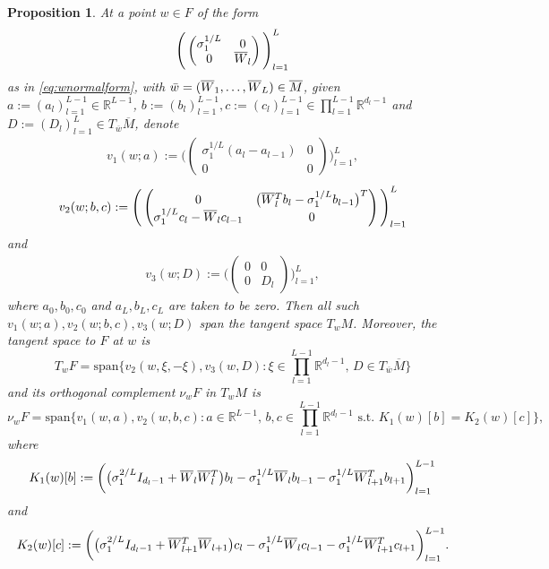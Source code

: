 \documentclass{article}
\newcommand{\RB}{\mathbb{R}}
\newcommand{\bw}{\overline{w}}
\newcommand{\bW}{\smash{\overline{W}}\vphantom{W}}
\newcommand{\bM}{\overline{M}}
\theoremstyle{plain}
\newtheorem{proposition}[theorem]{Proposition}
\theoremstyle{definition}
\theoremstyle{remark}
\begin{document}
\begin{proposition}\label{prop:tangents}
    At a point $w\in F$ of the form
    \begin{align}
    \Bigg(\begin{pmatrix} \sigma_1^{1/L} & 0 \\ 0 & \bW_l\end{pmatrix}\Bigg)_{l=1}^L
    \end{align}
    as in \eqref{eq:wnormalform}, with $\bar{w}=(\bW_1,\dots,\bW_L)\in\overline{M}$, given $a:=(a_l)_{l=1}^{L-1}\in \RB^{L-1}$, $b:=(b_l)_{l=1}^{L-1},c:=(c_l)_{l=1}^{L-1}\in\prod_{l=1}^{L-1}\RB^{d_l-1}$ and $D:=(D_l)_{l=1}^{L}\in T_{\bw}\bM$, denote
    \begin{align}
        v_1(w;a):=\Bigg(\begin{pmatrix} \sigma_1^{1/L}(a_l-a_{l-1}) & 0 \\ 0 & 0\end{pmatrix}\Bigg)_{l=1}^{L},
    \end{align}
    \begin{align}
        v_2(w;b,c):=\Bigg(\begin{pmatrix} 0 & \big(\bW_l^Tb_l - \sigma_1^{1/L}b_{l-1}\big)^T \\ \sigma_1^{1/L}c_l-\bW_lc_{l-1} & 0\end{pmatrix}\Bigg)_{l=1}^{L}
    \end{align}
    and
    \begin{align}
        v_3(w;D):=\bigg(\begin{pmatrix} 0 & 0 \\ 0 & D_l\end{pmatrix}\bigg)_{l=1}^{L},
    \end{align}
    where $a_0,b_0,c_0$ and $a_L,b_L,c_L$ are taken to be zero. Then all such $v_1(w;a),v_2(w;b,c),v_3(w;D)$ span the tangent space $T_wM$. Moreover, the tangent space to $F$ at $w$ is
    \begin{equation}
        T_wF = \mathrm{span}\bigg\{v_2(w,\xi,-\xi),v_3(w,D):\xi\in\prod_{l=1}^{L-1}\RB^{d_l-1},\,D\in T_{\bw}\bM\bigg\}
    \end{equation}
    and its orthogonal complement $\nu_wF$ in $T_wM$ is
    \begin{equation}
        \nu_wF = \mathrm{span}\bigg\{v_1(w,a),v_2(w,b,c):a\in\RB^{L-1},\,b,c\in\prod_{l=1}^{L-1}\RB^{d_l-1}\text{ s.t. }K_1(w)[b] = K_2(w)[c]\bigg\},
    \end{equation}
    where
    \begin{equation}
        K_1(w)[b]:=\bigg(\big(\sigma_1^{2/L}I_{d_l-1}+\bW_l\bW_l^T\big)b_l - \sigma_1^{1/L}\bW_lb_{l-1} - \sigma_1^{1/L}\bW_{l+1}^Tb_{l+1}\bigg)_{l=1}^{L-1}
    \end{equation}
    and
    \begin{equation}
        K_2(w)[c]:=\bigg(\big(\sigma_1^{2/L}I_{d_l-1}+\bW_{l+1}^T\bW_{l+1}\big)c_l-\sigma_1^{1/L}\bW_lc_{l-1}-\sigma_1^{1/L}\bW_{l+1}^Tc_{l+1}\bigg)_{l=1}^{L-1}.
    \end{equation}
\end{proposition}
\end{document}
